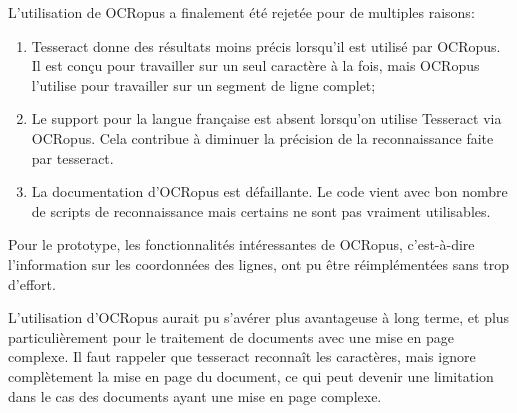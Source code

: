 L'utilisation de OCRopus a finalement été rejetée pour de multiples raisons:
\begin{enumerate}
    \item Tesseract donne des résultats moins précis lorsqu'il est utilisé par OCRopus. Il est conçu pour travailler sur un seul caractère à la fois, mais OCRopus l'utilise pour travailler sur un segment de ligne complet;
    \item Le support pour la langue française est absent lorsqu'on utilise Tesseract via OCRopus. Cela contribue à diminuer la précision de la reconnaissance faite par tesseract.
    \item La documentation d'OCRopus est défaillante. Le code vient avec bon nombre de scripts de reconnaissance mais certains ne sont pas vraiment utilisables.
\end{enumerate}

Pour le prototype, les fonctionnalités intéressantes de OCRopus, c'est-à-dire l'information sur les coordonnées des lignes, ont pu être réimplémentées sans trop d'effort. 

L'utilisation d'OCRopus aurait pu s'avérer plus avantageuse à long terme, et plus particulièrement pour le traitement de documents avec une mise en page complexe. Il faut rappeler que tesseract reconnaît les caractères, mais ignore complètement la mise en page du document, ce qui peut devenir une limitation dans le cas des documents ayant une mise en page complexe.
